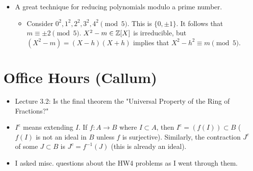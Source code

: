 \documentclass[../notes.tex]{subfiles}
\begin{document}
\begin{itemize}
\begin{proof}
        \begin{equation*}
            = X^d-\left( \sum_{i=1}^dz_i \right)X^{d-1}+\left( \sum_{1\leq i\leq j\leq d}z_iz_j \right)X^{d-2}+\cdots
        \end{equation*}
        The second term is equal to $b_1/b_0$; the third is $b_2/b_0$; etc.
        We thus have an upper bound
        \begin{equation*}
            |b_r/b_0| \leq (2C)^r\binom{d}{r}
        \end{equation*}
        Note that $\ell(g)\mid\ell(f)$. The search for the coefficients is now limited to a finite space, and we are done. $a_0b_r/b_0\in\Z$ and we have an upper bound on its absolute value, specifically the following which, at this point, we can turn over the problem to someone with a computer to solve.
        \begin{equation*}
            |a_0b_r/b_0| \leq (2C)^r\binom{d}{r}(a_0)
        \end{equation*}
    \end{proof}
    \item A great technique for reducing polynomials modulo a prime number.
    \begin{itemize}
        \item Consider $0^2,1^2,2^2,3^2,4^2\pmod 5$. This is $\{0,\pm 1\}$. It follows that $m\equiv\pm 2\pmod 5$. $X^2-m\in\mathbb{Z}[X]$ is irreducible, but $(X^2-m)=(X-h)(X+h)$ implies that $X^2-h^2\equiv m\pmod 5$.
    \end{itemize}
\end{itemize}



\section{Office Hours (Callum)}
\begin{itemize}
    \item Lecture 3.2: Is the final theorem the "Universal Property of the Ring of Fractions?"
    \item $I^e$ means extending $I$. If $f:A\to B$ where $I\subset A$, then $I^e=(f(I))\subset B$ ($f(I)$ is not an ideal in $B$ unless $f$ is surjective). Similarly, the contraction $J^c$ of some $J\subset B$ is $J^c=f^{-1}(J)$ (this is already an ideal).
    \item I asked misc. questions about the HW4 problems as I went through them.
\end{itemize}
\end{document}
